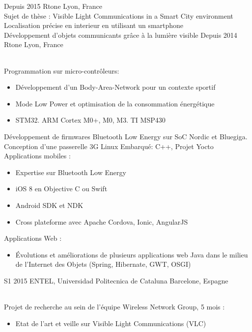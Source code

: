 \documentclass[]{cv-style}          %
\begin{document}
\begin{entrylist}
\entry
  {Depuis 2015}
  {Rtone}
  {Lyon, France}
  {\\
  Sujet de thèse : Visible Light Communications in a Smart City environment\\ 
  Localisation précise en interieur en utilisant un smartphone\\
  Développement d'objets communicants grâce à la lumière visible}
\entry
  {Depuis 2014}
  {Rtone}
  {Lyon, France}
  {\\
  Programmation sur micro-contrôleurs:
  \begin{itemize}
    \item Développement d'un Body-Area-Network pour un contexte sportif
    \item Mode Low Power et optimisation de la consommation énergétique
    \item STM32. ARM Cortex M0+, M0, M3. TI MSP430
  \end{itemize}
  Développement de firmwares Bluetooth Low Energy sur SoC Nordic et Bluegiga.\\
  Conception d'une passerelle 3G Linux Embarqué: C++, Projet Yocto\\
  Applications mobiles :
  \begin{itemize}
    \item Expertise sur Bluetooth Low Energy
    \item iOS 8 en Objective C ou Swift
    \item Android SDK et NDK
    \item Cross plateforme avec Apache Cordova, Ionic, AngularJS
  \end{itemize}
  Applications Web :
  \begin{itemize}
    \item Évolutions et améliorations de plusieurs applications web Java dans le milieu de l'Internet des Objets (Spring, Hibernate, GWT, OSGI)
  \end{itemize}}
 \entry
  {S1 2015 }
  {ENTEL, Universidad Politecnica de Cataluna}
  {Barcelone, Espagne}
  {\\
  Projet de recherche au sein de l'équipe Wireless Network Group, 5 mois :
  \begin{itemize}
    \item Etat de l'art et veille sur Visible Light Communications (VLC)

\end{itemize}}
\end{entrylist}
\end{document}
